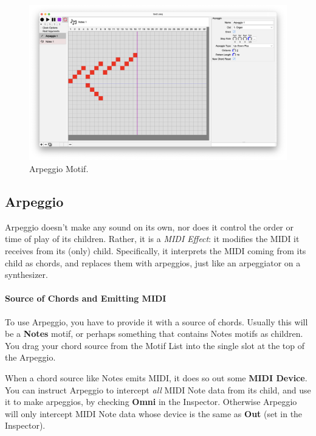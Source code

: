 \documentclass[twoside,10pt]{article}
\begin{document}
\clearpage

\begin{figure}[t]
\centering
\includegraphics[width=6.5in]{Arpeggio}
\vspace{-2em}
\caption{Arpeggio Motif.}
\label{arpeggio}
\end{figure}

\subsection{Arpeggio}

Arpeggio doesn't make any sound on its own, nor does it control the order or time of play of its children.  Rather, it is a {\it MIDI Effect}: it modifies the MIDI it receives from its (only) child.  Specifically, it interprets the MIDI coming from its child as chords, and replaces them with arpeggios, just like an arpeggiator on a synthesizer.

\paragraph{Source of Chords and Emitting MIDI}

To use Arpeggio, you have to provide it with a source of chords.  Usually this will be a {\bf Notes} motif, or perhaps something that contains Notes motifs as children.  You drag your chord source from the Motif List into the single slot at the top of the Arpeggio.

When a chord source like Notes emits MIDI, it does so out some {\bf MIDI Device}.  You can instruct Arpeggio to intercept {\it all} MIDI Note data from its child, and use it to make arpeggios, by checking {\bf Omni} in the Inspector.  Otherwise Arpeggio will only intercept MIDI Note data whose device is the same as {\bf Out} (set in the Inspector).
\end{document}
